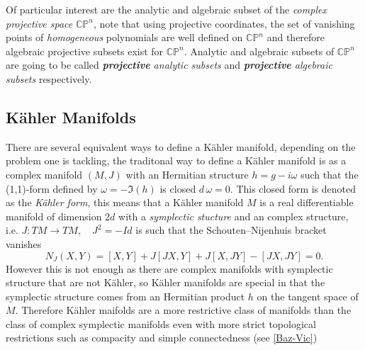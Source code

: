 \documentclass[12pt,twoside,a4paper]{report}
\newcommand{\cp}{\ensuremath{\mathbb{CP}}}
\begin{document}
Of particular interest are the analytic and algebraic subset of the \emph{complex projective space} $\cp^{n}$, note that using projective coordinates, the set of vanishing points of \emph{homogeneous} polynomials are well defined on $\cp^n$ and therefore algebraic projective subsets exist for $\cp^{n}$. Analytic and algebraic subsets of $\cp^n$ are going to be called  \emph{\textbf{projective} analytic subsets} and \emph{\textbf{projective} algebraic subsets} respectively.

\subsection{Kähler Manifolds}
There are several equivalent ways to define a K\"ahler manifold, depending on the problem one is tackling, the traditonal way to define a Kähler manifold is as a complex manifold $(M,J)$ with an Hermitian structure $h=g-i\omega$ such that the (1,1)-form defined by $\omega=-\Im (h)$ is closed $d\,\omega=0$. This closed form is denoted as the \emph{K\"ahler form}, this means that a Kähler manifold $M$ is a real differentiable manifold of dimension $2d$ with a \emph{symplectic stucture} and an complex structure, i.e. $J:TM\rightarrow TM,\quad J^2=-Id$ is such that the Schouten–Nijenhuis bracket vanishes
\[
  N_{J}(X,Y)=[X,Y]+J[JX,Y]+J[X,JY]-[JX,JY]=0.
\]
However this is not enough as there are complex manifolds with symplectic structure that are not Kähler, so Kähler manifolds are special in that the symplectic structure comes from an Hermitian product $h$ on the tangent space of $M$. Therefore Kähler maifolds are a more restrictive class of manifolds than the class of complex symplectic manifolds even with more strict topological restrictions such as compacity and simple connectedness (see \ref{Baz-Vic})
\end{document}
